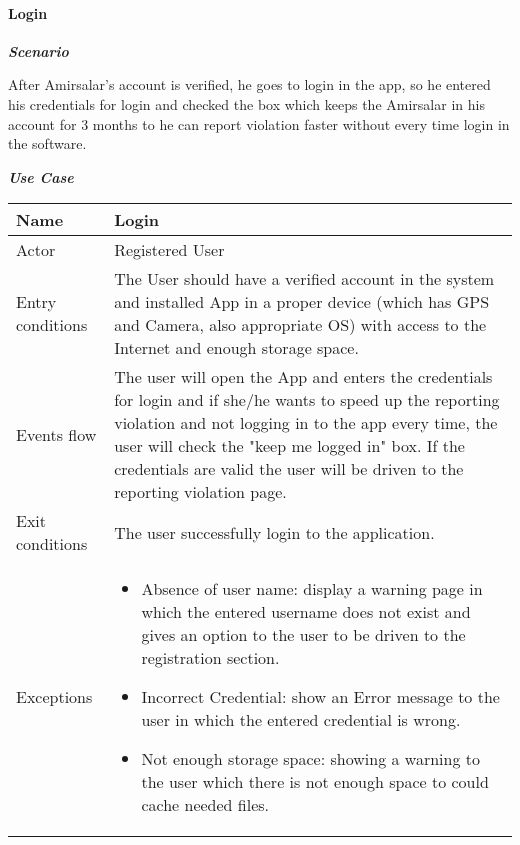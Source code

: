 \paragraph{Login}
\hfill \break

\begin{flushleft}\emph{\textbf{Scenario}}\end{flushleft}

After Amirsalar's account is verified, he goes to login in the app, so he entered his credentials for login and checked the box which keeps the Amirsalar in his account for 3 months to he can report violation faster without every time login in the software.


\begin{table}[H]
\begin{flushleft}\emph{\textbf{Use Case}}\end{flushleft}
\footnotesize
\centering
\settowidth{}
\setlength\extrarowheight{2pt}
\begin{tabulary}{\textwidth}{|J|J|}
\hline
Name             & Login \\
\hline
Actor            & Registered User \\
\hline
Entry conditions & The User should have a verified account in the system and installed App in a proper device (which has GPS and Camera, also appropriate OS) with access to the Internet and enough storage space.\\
\hline 
Events flow      & The user will open the App and enters the credentials for login and if she/he wants to speed up the reporting violation and not logging in to the app every time, the user will check the "keep me logged in" box. If the credentials are valid the user will be driven to the reporting violation page.\\
\hline 
Exit conditions  & The user successfully login to the application.\\
\hline 
Exceptions       & 
\begin{minipage}[t]{0.8\textwidth}
\begin{itemize} 
\item Absence of user name: display a warning page in which the entered username does not exist and gives an option to the user to be driven to the registration section.
\item Incorrect Credential: show an Error message to the user in which the entered credential is wrong.
\item Not enough storage space: showing a warning to the user which there is not enough space to could cache needed files.

\end{itemize}
\end{minipage}
\end{tabulary}
\end{table}
